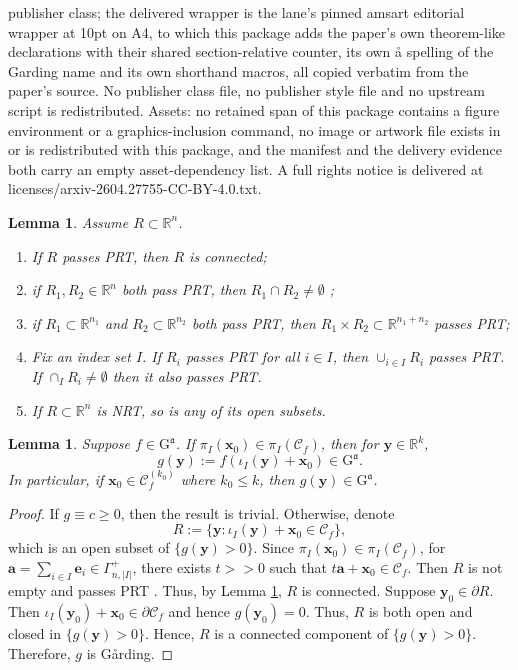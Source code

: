 \documentclass[10pt,a4paper]{amsart}
\providecommand{\lemmaname}{Lemma}
\numberwithin{equation}{section}
\numberwithin{figure}{section}
\theoremstyle{plain}
\theoremstyle{remark}
\theoremstyle{definition}
\theoremstyle{plain}
\newtheorem{lem}[thm]{\protect\lemmaname}
\theoremstyle{definition}
\theoremstyle{plain}
\theoremstyle{plain}
\theoremstyle{plain}
\newcommand{\pdv}{\partial}
\def\R{\mathbb R}
\def\G{{\mathrm G}^\mathfrak{a}}
\def\C{\mathcal C}
\def\x{\mathbf{x}}
\def\y{\mathbf{y}}
\providecommand{\lemmaname}{Lemma}
\providecommand{\lemmaname}{Lemma}
\begin{document}
publisher class; the delivered wrapper is the lane's pinned amsart editorial wrapper at 10pt on A4, to which this package adds the paper's own theorem-like declarations with their shared section-relative counter, its own {\aa} spelling of the Garding name and its own shorthand macros, all copied verbatim from the paper's source. No publisher class file, no publisher style file and no upstream script is redistributed. Assets: no retained span of this package contains a figure environment or a graphics-inclusion command, no image or artwork file exists in or is redistributed with this package, and the manifest and the delivery evidence both carry an empty asset-dependency list. A full rights notice is delivered at licenses/arxiv-2604.27755-CC-BY-4.0.txt.
\setcounter{section}{2}
\setcounter{thm}{4}
\begin{lem}
\label{lem:basic}Assume $R\subset\R^{n}$.
\begin{enumerate}
\item If $R$ passes PRT, then $R$ is connected; 
\item \label{enu:if--and}if $R_{1},$$R_{2}\in\R^{n}$ both pass PRT, then
$R_{1}\cap R_{2}\neq\emptyset$ ; 
\item \label{enu:directproduct}if $R_{1}\subset\R^{n_{1}}$ and $R_{2}\subset\R^{n_{2}}$
both pass PRT, then $R_{1}\times R_{2}\subset\R^{n_{1}+n_{2}}$ passes
PRT;
\item Fix an index set $I$. If $R_{i}$ passes PRT for all $i\in I$, then
$\cup_{i\in I}R_{i}$ passes PRT. If $\cap_{I}R_{i}\not=\emptyset$
then it also passes PRT.
\item \label{enu:NRTlabel}If $R\subset\R^{n}$ is NRT, so is any of its
open subsets.
\end{enumerate}
\end{lem}

\setcounter{section}{5}
\setcounter{thm}{14}
\begin{lem}
\label{lem:For-any-.}Suppose $f\in\G$. If $\pi_{I}(\mathbf{x}_{0})\in\pi_{I}(\mathcal{C}_{f})$,
then for $\mathbf{y}\in\mathbb{R}^{k}$, 
\[
g(\mathbf{y}):=f(\iota_{I}(\mathbf{y})+\mathbf{x}_{0})\in\G.
\]
In particular, if $\x_{0}\in\C_{f}^{(k_{0})}$ where $k_{0}\leq k$,
then $g(\y)\in\G$.
\end{lem}

\begin{proof}
If $g\equiv c\geq0$, then the result is trivial. Otherwise, denote
\[
R:=\{\mathbf{y}:\iota_{I}(\mathbf{y})+\mathbf{x}_{0}\in\mathcal{C}_{f}\},
\]
which is an open subset of $\{g(\mathbf{y})>0\}$. Since $\pi_{I}(\mathbf{x}_{0})\in\pi_{I}(\mathcal{C}_{f})$,
for $\mathbf{a}=\sum_{i\in I}\mathbf{e}_{i}\in\Gamma_{n,|I|}^{+}$,
there exists $t>>0$ such that $t\mathbf{a}+\mathbf{x}_{0}\in\C_{f}$.
Then $R$ is not empty and passes PRT . Thus, by Lemma \ref{lem:basic},
$R$ is connected. Suppose $\mathbf{y}_{0}\in\pdv R$. Then $\iota_{I}(\mathbf{y}_{0})+\mathbf{x}_{0}\in\pdv\mathcal{C}_{f}$
and hence $g(\mathbf{y}_{0})=0$. Thus, $R$ is both open and closed
in $\{g(\mathbf{y})>0\}$. Hence, $R$ is a connected component of
$\{g(\mathbf{y})>0\}$. Therefore, $g$ is Gårding. 
\end{proof}
\end{document}
